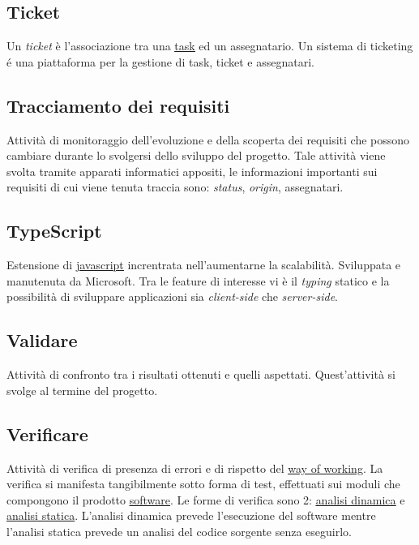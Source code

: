 	\subsection{Ticket}
	\label{sec:telegram}
	Un \emph{ticket} è l'associazione tra una \underline{\hyperref[sec:task]{task}} ed un assegnatario. Un sistema di ticketing é una piattaforma per la gestione di task, ticket e assegnatari. 


	\subsection{Tracciamento dei requisiti}
	\label{sec:tracciamentorequisiti}
	Attività di monitoraggio dell'evoluzione e della scoperta dei requisiti che possono cambiare durante lo svolgersi dello sviluppo del progetto. Tale attività viene svolta tramite apparati informatici appositi, le informazioni importanti sui requisiti di cui viene tenuta traccia sono: \emph{status}, \emph{origin}, assegnatari.


	\subsection{TypeScript}
	\label{sec:typescript}
	Estensione di \underline{\hyperref[sec:javascript]{javascript}} increntrata nell'aumentarne la scalabilità. Sviluppata e manutenuta da Microsoft. Tra le feature di interesse vi è il \emph{typing} statico e la possibilità di sviluppare applicazioni sia \emph{client-side} che \emph{server-side}.

	\newpage
	
	
	\subsection{Validare}
	\label{sec:validare}
	Attività di confronto tra i risultati ottenuti e quelli aspettati. Quest'attività si svolge al termine del progetto.

	
	\subsection{Verificare}
	\label{sec:verificare}
	Attività di verifica di presenza di errori e di rispetto del \underline{\hyperref[sec:wow]{way of working}}. La verifica si manifesta tangibilmente sotto forma di test, effettuati sui moduli che compongono il prodotto \underline{\hyperref[sec:prodottosoftware]{software}}. Le forme di verifica sono 2: \hyperref[sec:analisidinamica]{\underline{analisi dinamica}} e \hyperref[sec:analisistatica]{\underline{analisi statica}}. L'analisi dinamica prevede l'esecuzione del software mentre l'analisi statica prevede un analisi del codice sorgente senza eseguirlo.


